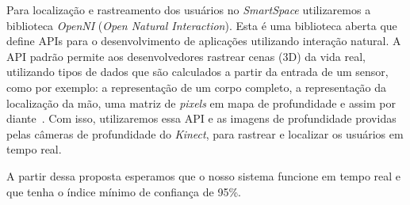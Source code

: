 	Para localização e rastreamento dos usuários no \textit{SmartSpace} utilizaremos a biblioteca \textit{OpenNI} (\textit{Open Natural Interaction}). Esta é uma biblioteca aberta que define APIs para o desenvolvimento de aplicações utilizando interação natural. A API padrão permite aos desenvolvedores rastrear cenas (3D) da vida real, utilizando tipos de dados que são calculados a partir da entrada de um sensor, como por exemplo: a representação de um corpo completo, a representação da localização da mão, uma matriz de  \textit{pixels} em mapa de profundidade e assim por diante~\cite{openni}. Com isso, utilizaremos essa API e as imagens de profundidade providas pelas câmeras de profundidade do \textit{Kinect}, para rastrear e localizar os usuários em tempo real.

	A partir dessa proposta esperamos que o nosso sistema funcione em tempo real e que tenha o índice mínimo de confiança de 95\%. 